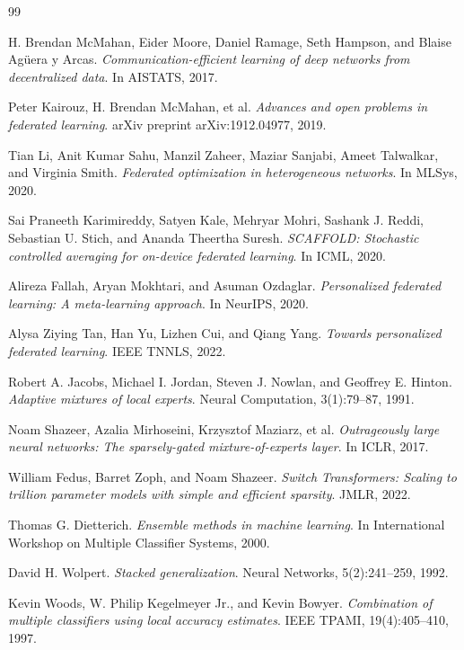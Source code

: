 \documentclass[12pt]{article}
\begin{document}
\begin{thebibliography}{99}

H. Brendan McMahan, Eider Moore, Daniel Ramage, Seth Hampson, and Blaise Agüera y Arcas.
\textit{Communication-efficient learning of deep networks from decentralized data}.
In AISTATS, 2017.

Peter Kairouz, H. Brendan McMahan, et al.
\textit{Advances and open problems in federated learning}.
arXiv preprint arXiv:1912.04977, 2019.

Tian Li, Anit Kumar Sahu, Manzil Zaheer, Maziar Sanjabi, Ameet Talwalkar, and Virginia Smith.
\textit{Federated optimization in heterogeneous networks}.
In MLSys, 2020.

Sai Praneeth Karimireddy, Satyen Kale, Mehryar Mohri, Sashank J. Reddi, Sebastian U. Stich, and Ananda Theertha Suresh.
\textit{SCAFFOLD: Stochastic controlled averaging for on-device federated learning}.
In ICML, 2020.

Alireza Fallah, Aryan Mokhtari, and Asuman Ozdaglar.
\textit{Personalized federated learning: A meta-learning approach}.
In NeurIPS, 2020.

Alysa Ziying Tan, Han Yu, Lizhen Cui, and Qiang Yang.
\textit{Towards personalized federated learning}.
IEEE TNNLS, 2022.

Robert A. Jacobs, Michael I. Jordan, Steven J. Nowlan, and Geoffrey E. Hinton.
\textit{Adaptive mixtures of local experts}.
Neural Computation, 3(1):79--87, 1991.

Noam Shazeer, Azalia Mirhoseini, Krzysztof Maziarz, et al.
\textit{Outrageously large neural networks: The sparsely-gated mixture-of-experts layer}.
In ICLR, 2017.

William Fedus, Barret Zoph, and Noam Shazeer.
\textit{Switch Transformers: Scaling to trillion parameter models with simple and efficient sparsity}.
JMLR, 2022.

Thomas G. Dietterich.
\textit{Ensemble methods in machine learning}.
In International Workshop on Multiple Classifier Systems, 2000.

David H. Wolpert.
\textit{Stacked generalization}.
Neural Networks, 5(2):241--259, 1992.

Kevin Woods, W. Philip Kegelmeyer Jr., and Kevin Bowyer.
\textit{Combination of multiple classifiers using local accuracy estimates}.
IEEE TPAMI, 19(4):405--410, 1997.


\end{thebibliography}
\end{document}
